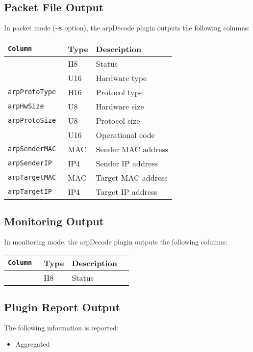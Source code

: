 \documentclass[documentation]{subfiles}
\begin{document}
\clearpage

\subsection{Packet File Output}
In packet mode ({\tt --s} option), the arpDecode plugin outputs the following columns:
\begin{longtable}{>{\tt}lll}
    \toprule
    {\bf Column}        & {\bf Type} & {\bf Description}\\
    \midrule\endhead%
    \nameref{arpStat}   & H8         & Status\\
    \nameref{arpHwType} & U16        & Hardware type\\
    arpProtoType        & H16        & Protocol type\\
    arpHwSize           & U8         & Hardware size\\
    arpProtoSize        & U8         & Protocol size\\
    \nameref{arpOpcode} & U16        & Operational code\\
    arpSenderMAC        & MAC        & Sender MAC address\\
    arpSenderIP         & IP4        & Sender IP address\\
    arpTargetMAC        & MAC        & Target MAC address\\
    arpTargetIP         & IP4        & Target IP address\\
    \bottomrule
\end{longtable}

\subsection{Monitoring Output}
In monitoring mode, the arpDecode plugin outputs the following columns:
\begin{longtable}{>{\tt}lll>{\tt\small}l}
    \toprule
    {\bf Column}      & {\bf Type}  & {\bf Description}\\
    \midrule\endhead%
    \nameref{arpStat} & H8          & Status \\
    \bottomrule
\end{longtable}

\subsection{Plugin Report Output}
The following information is reported:
\begin{itemize}
    \item Aggregated {\tt{}}
\end{itemize}
\end{document}

